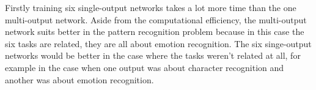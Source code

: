 \documentclass[a4paper,11pt]{article}
\begin{document}
Firstly training six single-output networks takes a lot more time than the one multi-output network. Aside from the computational efficiency, the multi-output network suits better in the pattern recognition problem because in this case the six tasks are related, they are all about emotion recognition. The six singe-output networks would be better in the case where the tasks weren’t related at all, for example in the case when one output was about character recognition and another was about emotion recognition.
\end{document}
